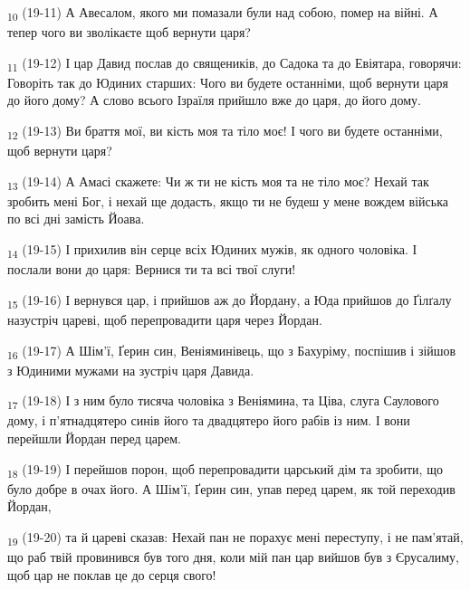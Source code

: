 \begin{tcolorbox}
\textsubscript{10} (19-11) А Авесалом, якого ми помазали були над собою, помер на війні. А тепер чого ви зволікаєте щоб вернути царя?
\end{tcolorbox}
\begin{tcolorbox}
\textsubscript{11} (19-12) І цар Давид послав до священиків, до Садока та до Евіятара, говорячи: Говоріть так до Юдиних старших: Чого ви будете останніми, щоб вернути царя до його дому? А слово всього Ізраїля прийшло вже до царя, до його дому.
\end{tcolorbox}
\begin{tcolorbox}
\textsubscript{12} (19-13) Ви браття мої, ви кість моя та тіло моє! І чого ви будете останніми, щоб вернути царя?
\end{tcolorbox}
\begin{tcolorbox}
\textsubscript{13} (19-14) А Амасі скажете: Чи ж ти не кість моя та не тіло моє? Нехай так зробить мені Бог, і нехай ще додасть, якщо ти не будеш у мене вождем війська по всі дні замість Йоава.
\end{tcolorbox}
\begin{tcolorbox}
\textsubscript{14} (19-15) І прихилив він серце всіх Юдиних мужів, як одного чоловіка. І послали вони до царя: Вернися ти та всі твої слуги!
\end{tcolorbox}
\begin{tcolorbox}
\textsubscript{15} (19-16) І вернувся цар, і прийшов аж до Йордану, а Юда прийшов до Ґілґалу назустріч цареві, щоб перепровадити царя через Йордан.
\end{tcolorbox}
\begin{tcolorbox}
\textsubscript{16} (19-17) А Шім'ї, Ґерин син, Веніяминівець, що з Бахуріму, поспішив і зійшов з Юдиними мужами на зустріч царя Давида.
\end{tcolorbox}
\begin{tcolorbox}
\textsubscript{17} (19-18) І з ним було тисяча чоловіка з Веніямина, та Ціва, слуга Саулового дому, і п'ятнадцятеро синів його та двадцятеро його рабів із ним. І вони перейшли Йордан перед царем.
\end{tcolorbox}
\begin{tcolorbox}
\textsubscript{18} (19-19) І перейшов порон, щоб перепровадити царський дім та зробити, що було добре в очах його. А Шім'ї, Ґерин син, упав перед царем, як той переходив Йордан,
\end{tcolorbox}
\begin{tcolorbox}
\textsubscript{19} (19-20) та й цареві сказав: Нехай пан не порахує мені переступу, і не пам'ятай, що раб твій провинився був того дня, коли мій пан цар вийшов був з Єрусалиму, щоб цар не поклав це до серця свого!
\end{tcolorbox}
